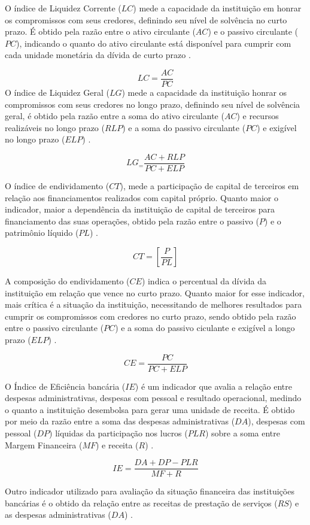 \documentclass[12pt,12pt,openright,oneside,a4paper,chapter=TITLE,section=TITLE,subsection=TITLE,subsubsection=TITLE english,french,spanish,portugues,sumario=tradicional]{abntex2}
\begin{document}
O índice de Liquidez Corrente (\(LC\)) mede a capacidade da instituição em honrar os compromissos com seus credores, definindo seu nível de solvência no curto prazo. É obtido pela razão entre o ativo circulante (\(AC\)) e o passivo circulante (\(PC\)), indicando o quanto do ativo circulante está disponível para cumprir com cada unidade monetária da dívida de curto prazo \cite{graham:2012} \cite{assaf:2020}.

\[
LC = \frac{AC}{PC}
\]
O índice de Liquidez Geral (\(LG\)) mede a capacidade da instituição honrar os compromissos com seus credores no longo prazo, definindo seu nível de solvência geral, é obtido pela razão entre a soma do ativo circulante (\(AC\)) e recursos realizáveis no longo prazo (\(RLP\)) e a soma do passivo circulante (\(PC\)) e exigível no longo prazo (\(ELP\)) \cite{assaf:2020}.

\[
LG_ = \frac{AC + RLP}{PC + ELP}
\]

O índice de endividamento (\(CT\)), mede a participação de capital de terceiros em relação aos financiamentos realizados com capital próprio. Quanto maior o indicador, maior a dependência da instituição de capital de terceiros para financiamento das suas operações, obtido pela razão entre o passivo (\(P\)) e o patrimônio líquido (\(PL\)) \cite{assaf:2020}.

\[
CT = [\frac{P}{PL}]
\]

A composição do endividamento (\(CE\)) indica o percentual da dívida da instituição em relação que vence no curto prazo. Quanto maior for esse indicador, mais crítica é a situação da instituição, necessitando de melhores resultados para cumprir os compromissos com credores no curto prazo, sendo obtido pela razão entre o passivo circulante (\(PC\)) e a soma do passivo ciculante e exigível a longo prazo (\(ELP\)) \cite{assaf:2020}.

\[
CE = \frac{PC}{PC + ELP}
\]

O Índice de Eficiência bancária (\(IE\)) é um indicador que avalia a relação entre despesas administrativas, despesas com pessoal e resultado operacional, medindo o quanto a instituição desembolsa para gerar uma unidade de receita. É obtido por meio da razão entre a soma das despesas administrativas (\(DA\)), despesas com pessoal (\(DP\)) líquidas da participação nos lucros (\(PLR\)) sobre a soma entre Margem Financeira (\(MF\)) e receita (\(R\)) \cite{timotio:2018}.

\[
IE = \frac{DA + DP - PLR}{MF + R} 
\]

Outro indicador utilizado para avaliação da situação financeira das instituições bancárias é o obtido da relação entre as receitas de prestação de serviços (\(RS\)) e as despesas administrativas (\(DA\)) \cite{dantas:2012}.
\end{document}

